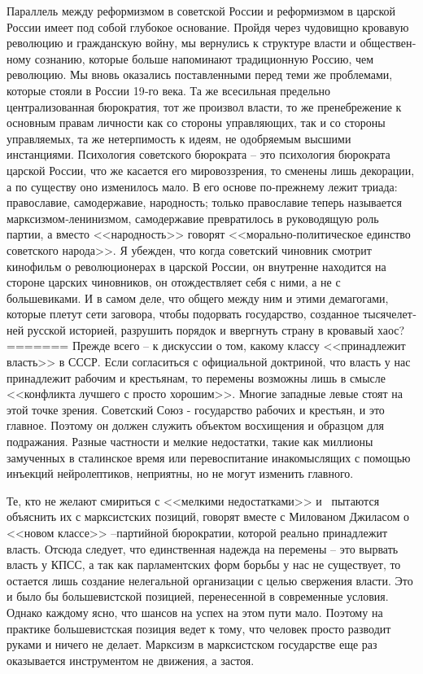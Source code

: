 \documentclass{book}
\begin{document}
Параллель между реформизмом в советской России и ре­формизмом в царской России имеет под собой глубокое осно­вание. Пройдя через чудовищно кровавую революцию и граж­данскую войну, мы вернулись к структуре власти и обществен­ному сознанию, которые больше напоминают традиционную Россию, чем революцию. Мы вновь оказались поставленными перед теми же проблемами, которые стояли в России 19‑го ве­ка. Та же всесильная предельно централизованная бюрокра­тия, тот же произвол власти, то же пренебрежение к основным правам личности как со стороны управляющих, так и со сторо­ны управляемых, та же нетерпимость к идеям, не одобряемым высшими инстанциями. Психология советского бюрократа -- это психология бюрократа царской России, что же касается его мировоззрения, то сменены лишь декорации, а по сущест­ву оно изменилось мало. В его основе по‑прежнему лежит три­ада: православие, самодержавие, народность; только правосла­вие теперь называется марксизмом‑ленинизмом, самодержа­вие превратилось в руководящую роль партии, а вместо <<на­родность>> говорят <<морально‑политическое единство совет­ского народа>>. Я убежден, что когда советский чиновник смот­рит кинофильм о революционерах в царской России, он внут­ренне находится на стороне царских чиновников, он отожде­ствляет себя с ними, а не с большевиками. И в самом деле, что общего между ним и этими демагогами, которые плетут сети заговора, чтобы подорвать государство, созданное тысячелет­ней русской историей, разрушить порядок и ввергнуть страну в кровавый хаос?
=======
Прежде всего -- к дискуссии о том, какому классу <<принад­лежит власть>> в СССР. Если согласиться с официальной доктри­ной, что власть у нас принадлежит рабочим и крестьянам, то перемены возможны лишь в смысле <<конфликта лучшего с просто хорошим>>. Многие западные левые стоят на этой точке зрения. Советский Союз - государство рабочих и крестьян, и это главное. Поэтому он должен служить объектом восхищения и образцом для подражания. Разные частности и мелкие недо­статки, такие как миллионы замученных в сталинское время или перевоспитание инакомыслящих с помощью инъекций нейролептиков, неприятны, но не могут изменить главного.

Те, кто не желают смириться с <<мелкими недостатками>> и  пытаются объяснить их с марксистских позиций, говорят вместе с Милованом Джиласом о <<новом классе>> --партийной бюрократии, которой реально принадлежит власть. Отсюда следует, что единственная надежда на перемены -- это вырвать власть у КПСС, а так как парламентских форм борьбы у нас не существует, то остается лишь создание нелегальной организации с целью свержения власти. Это и было бы большевистской позицией, перенесенной в современные условия. Однако каждому ясно, что шансов на успех на этом пути мало. Поэтому на практике большевистская позиция ведет к тому, что человек просто разводит руками и ничего не делает. Марксизм в марксистском государстве еще раз оказывается инструментом не движения, а застоя.
\end{document}
